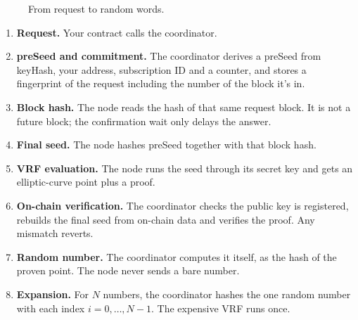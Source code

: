 \documentclass[11pt,a4paper]{article}
\begin{document}
\begin{figure}[ht]
\centering
{}
\caption{From request to random words.}
\end{figure}

\begin{enumerate}[label=\textbf{\arabic*.}]
  \item \textbf{Request.} Your contract calls the coordinator.
  \item \textbf{preSeed and commitment.} The coordinator derives a preSeed from keyHash, your address, subscription ID and a counter, and stores a fingerprint of the request including the number of the block it's in.
  \item \textbf{Block hash.} The node reads the hash of that same request block. It is not a future block; the confirmation wait only delays the answer.
  \item \textbf{Final seed.} The node hashes preSeed together with that block hash.
  \item \textbf{VRF evaluation.} The node runs the seed through its secret key and gets an elliptic-curve point plus a proof.
  \item \textbf{On-chain verification.} The coordinator checks the public key is registered, rebuilds the final seed from on-chain data and verifies the proof. Any mismatch reverts.
  \item \textbf{Random number.} The coordinator computes it itself, as the hash of the proven point. The node never sends a bare number.
  \item \textbf{Expansion.} For $N$ numbers, the coordinator hashes the one random number with each index $i = 0, \ldots, N-1$. The expensive VRF runs once.
\end{enumerate}
\end{document}
